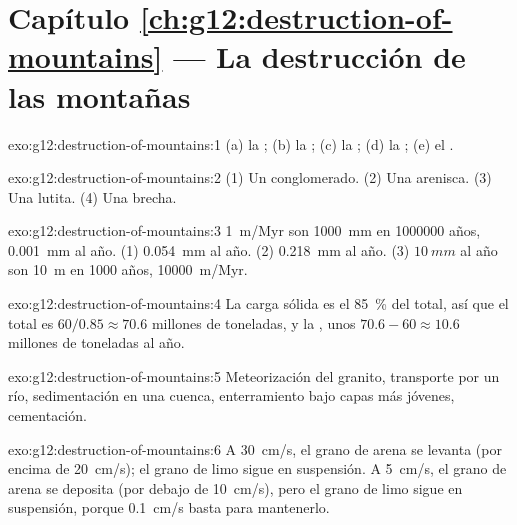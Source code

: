 \section*{Capítulo \ref{ch:g12:destruction-of-mountains} --- La destrucción de las montañas}

\begin{solution}{exo:g12:destruction-of-mountains:1}
(a) la ; (b) la ; (c) la ;
(d) la ; (e) el .
\end{solution}

\begin{solution}{exo:g12:destruction-of-mountains:2}
(1) Un conglomerado. (2) Una arenisca. (3) Una lutita. (4) Una brecha.
\end{solution}

\begin{solution}{exo:g12:destruction-of-mountains:3}
\qty{1}{m/Myr} son \qty{1000}{mm} en \num{1000000} años, \qty{0.001}{mm} al
año. (1) \qty{0.054}{mm} al año. (2) \qty{0.218}{mm} al año.
(3) $\qty{10}{mm}$ al año son \qty{10}{m} en 1000 años, \qty{10000}{m/Myr}.
\end{solution}

\begin{solution}{exo:g12:destruction-of-mountains:4}
La carga sólida es el \qty{85}{\percent} del total, así que el total es
$60/0.85
\approx 70.6$ millones de toneladas, y la , unos
$70.6 - 60 \approx
10.6$ millones de toneladas al año.
\end{solution}

\begin{solution}{exo:g12:destruction-of-mountains:5}
Meteorización del granito, transporte por un río, sedimentación en una
cuenca, enterramiento bajo capas más jóvenes, cementación.
\end{solution}

\begin{solution}{exo:g12:destruction-of-mountains:6}
A \qty{30}{cm/s}, el grano de arena se levanta (por encima de
\qty{20}{cm/s}); el grano de limo sigue en suspensión. A \qty{5}{cm/s}, el
grano de arena se deposita (por debajo de \qty{10}{cm/s}), pero el grano de
limo sigue en suspensión, porque \qty{0.1}{cm/s} basta para mantenerlo.
\end{solution}

